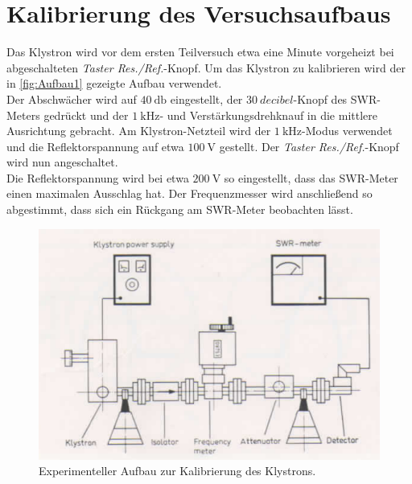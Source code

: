 \section{Kalibrierung des Versuchsaufbaus}
Das Klystron wird vor dem ersten Teilversuch etwa eine Minute vorgeheizt bei abgeschalteten \textit{Taster Res./Ref.}-Knopf. Um das Klystron zu kalibrieren wird der in \autoref{fig:Aufbau1} gezeigte
Aufbau verwendet.\\
Der Abschwächer wird auf $\qty{40}{\decibel}$ eingestellt, der $\qty{30}{decibel}$-Knopf des SWR-Meters gedrückt und der $\qty{1}{\kilo\hertz}$- und Verstärkungsdrehknauf in die mittlere Ausrichtung
gebracht. Am Klystron-Netzteil wird der $\qty{1}{\kilo\hertz}$-Modus verwendet und die Reflektorspannung auf etwa $\qty{100}{\volt}$ gestellt. Der  \textit{Taster Res./Ref.}-Knopf wird nun angeschaltet.\\
Die Reflektorspannung wird bei etwa $\qty{200}{\volt}$ so eingestellt, dass das SWR-Meter einen maximalen Ausschlag hat. Der Frequenzmesser wird anschließend so abgestimmt, dass sich ein Rückgang am SWR-Meter beobachten lässt.
\begin{figure}
    \centering
    \includegraphics[scale=0.4]{content/V53_pictures/Aufbau1.png}
    \caption{Experimenteller Aufbau zur Kalibrierung des Klystrons. \cite{exp_mikro}}
    \label{fig:Aufbau1}
\end{figure}

